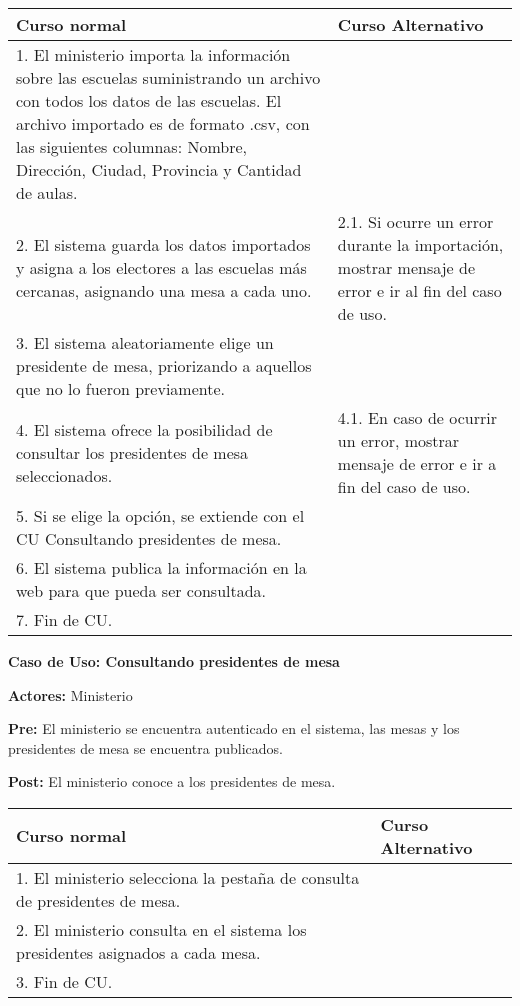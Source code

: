 \begin{table}[h!]
	
 \begin{tabular}{|p{7.5cm} | p{7.5cm}|} 
 \hline
 \textbf{Curso normal} & \textbf{Curso Alternativo} \\
 \hline

1. El ministerio importa la información sobre las escuelas suministrando un archivo con todos los datos de las escuelas. El archivo importado es de formato .csv, con las siguientes columnas: Nombre, Dirección, Ciudad, Provincia y Cantidad de aulas. & \\
\hline

2. El sistema guarda los datos importados y asigna a los electores a las escuelas más cercanas, asignando una mesa a cada uno. &
2.1. Si ocurre un error durante la importación, mostrar mensaje de error e ir al fin del caso de uso. \\
\hline
3. El sistema aleatoriamente elige un presidente de mesa, priorizando a aquellos que no lo fueron previamente. & \\
\hline

4. El sistema ofrece la posibilidad de consultar los presidentes de mesa seleccionados. &
4.1. En caso de ocurrir un error, mostrar mensaje de error e ir a fin del caso de uso. \\
\hline
5. Si se elige la opción, se extiende con el CU Consultando presidentes de mesa. & \\
\hline

6. El sistema publica la información en la web para que pueda ser consultada. & \\
\hline

7. Fin de CU. & \\
\hline

 \end{tabular}

\end{table}






\textbf{Caso de Uso: Consultando presidentes de mesa}

\textbf{Actores:} Ministerio 

\textbf{Pre:} El ministerio se encuentra autenticado en el sistema, las mesas y los presidentes de mesa se encuentra publicados.

\textbf{Post:} El ministerio conoce a los presidentes de mesa.
\begin{table}[h!]
	
 \begin{tabular}{|p{7.5cm} | p{7.5cm}|} 
 \hline
 \textbf{Curso normal} & \textbf{Curso Alternativo} \\
 \hline

1. El ministerio selecciona la pestaña de consulta de presidentes de mesa. & \\
\hline
2. El ministerio consulta en el sistema los presidentes asignados a cada mesa. & \\
\hline
3. Fin de CU. & \\
\hline
 \end{tabular}

\end{table}

